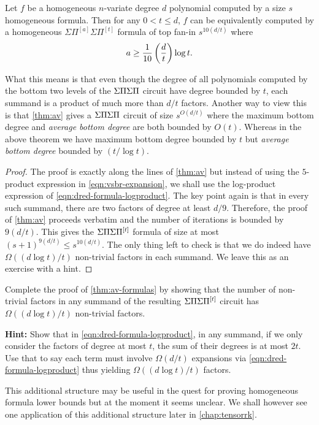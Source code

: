 \begin{theorem}\label{thm:av-formulas}
Let $f$ be a homogeneous $n$-variate degree $d$ polynomial computed by a size $s$ homogeneous formula. 
Then for any $0< t \leq d$, $f$ can be equivalently computed by a homogeneous $\Sigma\Pi^{[a]}\Sigma\Pi^{[t]}$ formula of top fan-in $s^{10(d/t)}$ where 
\[
a \geq \frac{1}{10}\left(\frac{d}{t}\right) \log t.
\]
\end{theorem}
What this means is that even though the degree of all polynomials computed by the bottom two levels of the $\Sigma\Pi\Sigma\Pi$ circuit have degree bounded by $t$, each summand is a product of much more than $d/t$ factors. Another way to view this is that \autoref{thm:av} gives a $\Sigma\Pi\Sigma\Pi$ circuit of size $s^{O(d/t)}$ where the maximum bottom degree and \emph{average bottom degree} are both bounded by $O(t)$. Whereas in the above theorem we have maximum bottom degree bounded by $t$ but \emph{average bottom degree} bounded by $(t / \log t)$. 

\begin{proof}The proof is exactly along the lines of \autoref{thm:av}
  but instead of using the $5$-product expression in \eqref{eqn:vsbr-expansion}, we shall use the log-product expression of \eqref{eqn:dred-formula-logproduct}.
The key point again is that in every such summand, there are two factors of degree at least $d/9$.
Therefore, the proof of \autoref{thm:av} proceeds verbatim and the number of iterations is bounded by $9(d/t)$.
This gives the $\Sigma\Pi\Sigma\Pi^{[t]}$ formula of size at most $(s+1)^{9(d/t)} \leq s^{10(d/t)}$.
The only thing left to check is that we do indeed have $\Omega((d\log t) / t)$ non-trivial factors in each summand. We leave this as an exercise with a hint. 
\end{proof}

\begin{exercise} Complete the proof of \autoref{thm:av-formulas} by showing that the number of non-trivial factors in any summand of the resulting $\Sigma\Pi\Sigma\Pi^{[t]}$ circuit has $\Omega((d\log t)/t)$ non-trivial factors. 

{\bf Hint:} Show that in \eqref{eqn:dred-formula-logproduct}, in any summand, if we only consider the factors of degree at most $t$, the sum of their degrees is at most $2t$. Use that to say each term must involve $\Omega(d/t)$ expansions via \eqref{eqn:dred-formula-logproduct} thus yielding $\Omega((d\log t)/t)$ factors. 
\end{exercise}

This additional structure may be useful in the quest for proving homogeneous formula lower bounds but at the moment it seems unclear. We shall however see one application of this additional structure later in \autoref{chap:tensorrk}. 

